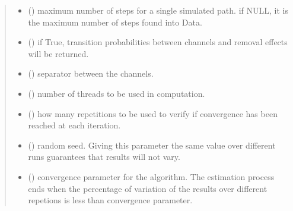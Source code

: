 \documentclass[letterpaper,10pt,english]{sphinxmanual}
\begin{document}
\begin{fulllineitems}
\begin{quote}
\begin{description}
\begin{itemize}
\item {} 
\sphinxAtStartPar
{} (\sphinxstyleliteralemphasis{\sphinxupquote{, }}) \textendash{} maximum number of steps for a single simulated path. if NULL, it is the maximum number of steps found into Data.

\item {} 
\sphinxAtStartPar
{} (\sphinxstyleliteralemphasis{\sphinxupquote{, }}) \textendash{} if True, transition probabilities between channels and removal effects will be returned.

\item {} 
\sphinxAtStartPar
{} (\sphinxstyleliteralemphasis{\sphinxupquote{, }}) \textendash{} separator between the channels.

\item {} 
\sphinxAtStartPar
{} (\sphinxstyleliteralemphasis{\sphinxupquote{, }}) \textendash{} number of threads to be used in computation.

\item {} 
\sphinxAtStartPar
{} (\sphinxstyleliteralemphasis{\sphinxupquote{, }}) \textendash{} how many repetitions to be used to verify if convergence has been reached at each iteration.

\item {} 
\sphinxAtStartPar
{} (\sphinxstyleliteralemphasis{\sphinxupquote{, }}) \textendash{} random seed. Giving this parameter the same value over different runs guarantees that results will not vary.

\item {} 
\sphinxAtStartPar
{} (\sphinxstyleliteralemphasis{\sphinxupquote{, }}) \textendash{} convergence parameter for the algorithm. The estimation process ends when the percentage of variation of the results over different repetions is less than convergence parameter.


\end{itemize}
\end{description}
\end{quote}
\end{fulllineitems}
\end{document}
